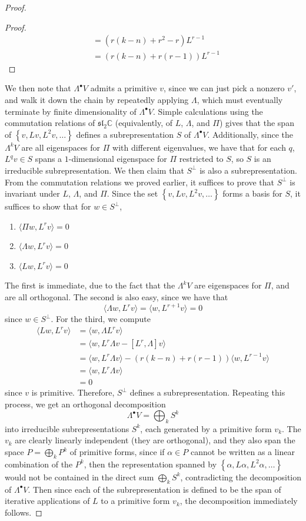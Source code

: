 \documentclass[psamsfonts, 12pt]{amsart}
\theoremstyle{definition}
\theoremstyle{remark}
\renewcommand{\sl}{\mathfrak{sl}}
\newcommand{\C}{\mathbb{C}}
\newcommand{\set}[1]{\left\lbrace #1 \right\rbrace}
\begin{document}
\begin{proof}
\begin{proof}
\begin{align*}
&= (r(k-n) + r^2-r)L^{r-1} \\
&= (r(k-n) + r(r-1))L^{r-1}
\end{align*}
\end{proof}
%
We then note that $\Lambda^\bullet V$ admits a primitive $v$, since we can just
pick a nonzero $v'$, and walk it down the chain by repeatedly applying $\Lambda$,
which must eventually terminate by finite dimensionality of $\Lambda^\bullet V$. Simple
calculations using the commutation relations of $\sl_2\C$ (equivalently, of
$L$, $\Lambda$, and $\Pi$) gives that the span of $\set{v, Lv, L^2v, \ldots}$ defines a
subrepresentation $S$ of $\Lambda^\bullet V$. Additionally, since the $\Lambda^k V$ are
all eigenspaces for $\Pi$ with different eigenvalues, we have that for each $q$,
$L^qv \in S$ spans a $1$-dimensional eigenspace for $\Pi$ restricted to $S$, so
$S$ is an irreducible subrepresentation. We then claim that $S^\perp$ is also
a subrepresentation. From the commutation relations we proved earlier, it suffices to
prove that $S^\perp$ is invariant under $L$, $\Lambda$, and $\Pi$. Since the set
$\set{v, Lv, L^2v, \ldots}$ forms a basis for $S$, it suffices to show that for
$w \in S^\perp$,
\begin{enumerate}
  \item $\langle \Pi w, L^rv \rangle = 0$
  \item $\langle \Lambda w, L^rv \rangle = 0$
  \item $\langle Lw, L^rv \rangle = 0$
\end{enumerate}
The first is immediate, due to the fact that the $\Lambda^k V$ are eigenspaces for
$\Pi$, and are all orthogonal. The second is also easy, since we have that
\[
\langle \Lambda w, L^r v \rangle = \langle w, L^{r+1}v\rangle = 0
\]
since $w \in S^\perp$. For the third, we compute
\begin{align*}
\langle Lw, L^rv \rangle &= \langle w,\Lambda L^rv \rangle \\
&= \langle w, L^r\Lambda v - [L^r,\Lambda]v \rangle \\
&= \langle w, L^r\Lambda v\rangle - (r(k-n) + r(r-1))\langle w,L^{r-1}v\rangle \\
&= \langle w, L^r\Lambda v\rangle \\
&= 0
\end{align*}
since $v$ is primitive. Therefore, $S^\perp$ defines a subrepresentation.
Repeating this process, we get an orthogonal decomposition
\[
\Lambda^\bullet V = \bigoplus_k S^k
\]
into irreducible subrepresentations $S^k$, each generated by a primitive form $v_k$.
The $v_k$ are clearly linearly independent (they are orthogonal), and they also
span the space $P = \bigoplus_k P^k$ of primitive forms, since if $\alpha \in P$
cannot be written as a linear combination of the $P^k$, then the representation
spanned by $\set{\alpha, L\alpha, L^2\alpha,\ldots}$ would not be contained in the
direct sum $\bigoplus_k S^k$, contradicting the decomposition of $\Lambda^\bullet V$.
Then since each of the subrepresentation is defined to be the span of iterative
applications of $L$ to a primitive form $v_k$, the decomposition immediately follows.
\end{proof}
\end{document}
